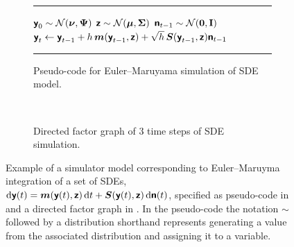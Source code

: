 \begin{figure}[!t]
\centering
\begin{subfigure}[b]{\linewidth}
\vskip 0pt
\centering
\hrule
\vskip 3pt
\begin{algorithmic}
\small
\State $\rvct{y}_0 \sim \nrm{\vct{\nu},\mtx{\Psi}}$
\State $\rvct{z} \sim \nrm{\vct{\mu},\mtx{\Sigma}}$
  \State $\rvct{n}_{t-1} \sim \nrm{\vct{0},\idmtx}$
  \State $\boldsymbol{\mathsf{y}}_{t} \gets \boldsymbol{\mathsf{y}}_{t-1} + h \, \boldsymbol{m}(\boldsymbol{\mathsf{y}}_{t-1},\boldsymbol{\mathsf{z}}) + \sqrt{h} \, \boldsymbol{S}(\boldsymbol{\mathsf{y}}_{t-1},\boldsymbol{\mathsf{z}})\boldsymbol{\mathsf{n}}_{t-1}$
\EndFor
\end{algorithmic}
\vskip 3pt
\hrule
\vskip 3pt
\captionsetup{justification=centering}
\caption{Pseudo-code for Euler--Maruyama simulation of \ac{SDE} model. } %
\label{sfig:sim-model-code} %
\end{subfigure}%
\\[2ex]
\begin{subfigure}[b]{\linewidth}
\vskip 0pt
\centering
{}
\caption{Directed factor graph of 3 time steps of \ac{SDE} simulation.}
\label{sfig:sim-model-factor-graph}
\end{subfigure}%
\caption[Simulator model example.]{Example of a simulator model corresponding to Euler--Maruyma integration of a set of \acfp{SDE}, \\$\dr \rvct{y}(t) = \vct{m}\lpa\rvct{y}(t),\rvct{z}\rpa \,\dr t + \mtx{S}\lpa\rvct{y}(t),\rvct{z}\rpa \, \dr\rvct{n}(t)$, specified as pseudo-code in  and a directed factor graph in . In the pseudo-code the notation $\sim$ followed by a distribution shorthand represents generating a value from the associated distribution and assigning it to a variable.} %
\label{fig:simulator-model-example}
\end{figure}

